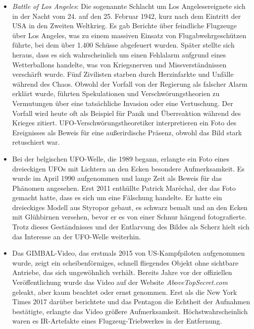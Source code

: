 \documentclass{scrartcl}
\begin{document}
\begin{itemize}
	\item \textit{Battle of Los Angeles}: Die sogenannte \frq Schlacht um Los Angeles\flq ereignete sich in der Nacht vom 24. auf den 25. Februar 1942, kurz nach dem Eintritt der USA in den Zweiten Weltkrieg. Es gab Berichte über feindliche Flugzeuge über Los Angeles, was zu einem massiven Einsatz von Flugabwehrgeschützen führte, bei dem über 1.400 Schüsse abgefeuert wurden. Später stellte sich heraus, dass es sich wahrscheinlich um einen Fehlalarm aufgrund eines Wetterballons handelte, was von Kriegsnerven und Missverständnissen verschärft wurde. Fünf Zivilisten starben durch Herzinfarkte und Unfälle während des Chaos. Obwohl der Vorfall von der Regierung als falscher Alarm erklärt wurde, führten Spekulationen und Verschwörungstheorien zu Vermutungen über eine tatsächliche Invasion oder eine Vertuschung. Der Vorfall wird heute oft als Beispiel für Panik und Überreaktion während des Krieges zitiert. UFO-Verschwörungstheoretiker interpretieren ein Foto des Ereignisses als Beweis für eine außerirdische Präsenz, obwohl das Bild stark retuschiert war. 
	\item Bei der belgischen UFO-Welle, die 1989 begann, erlangte ein Foto eines dreieckigen UFOs mit Lichtern an den Ecken besondere Aufmerksamkeit. Es wurde im April 1990 aufgenommen und lange Zeit als Beweis für das Phänomen angesehen. Erst 2011 enthüllte Patrick Maréchal, der das Foto gemacht hatte, dass es sich um eine Fälschung handelte. Er hatte ein dreieckiges Modell aus Styropor gebaut, es schwarz bemalt und an den Ecken mit Glühbirnen versehen, bevor er es von einer Schnur hängend fotografierte. Trotz dieses Geständnisses und der Entlarvung des Bildes als Scherz hielt sich das Interesse an der UFO-Welle weiterhin.  
	\item Das \frq GIMBAL\flq-Video, das erstmals 2015 von US-Kampfpiloten aufgenommen wurde, zeigt ein scheibenförmiges, schnell fliegendes Objekt ohne sichtbare Antriebe, das sich ungewöhnlich verhält. Bereits Jahre vor der offiziellen Veröffentlichung wurde das Video auf der Website \textit{AboveTopSecret.com} geleakt, aber kaum beachtet oder ernst genommen. Erst als die New York Times 2017 darüber berichtete und das Pentagon die Echtheit der Aufnahmen bestätigte, erlangte das Video größere Aufmerksamkeit. Höchstwahrscheinlich waren es IR-Artefakte eines Flugzeug-Triebwerkes in der Entfernung.


\end{itemize}
\end{document}
